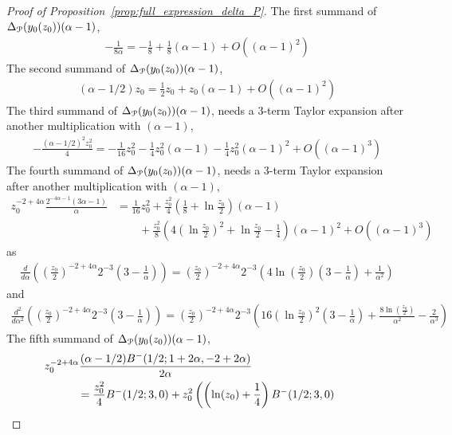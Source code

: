 \begin{proof}[Proof of Proposition~\ref{prop:full_expression_delta_P}]
The first summand of $\Delta_{{\mathcal P}}(y_0(z_0))(\alpha-1)$,
\begin{align*}
-\frac{1}{8 \alpha} = -\frac{1}{8}+\frac{1}{8}(\alpha-1) +O( (\alpha-1)^2)
\end{align*}
The second summand of $\Delta_{{\mathcal P}}(y_0(z_0))(\alpha-1)$,
\begin{align*}
(\alpha-1/2)z_0 = \frac{1}{2}z_0 +z_0 (\alpha-1)+O( (\alpha-1)^2)
\end{align*}
The third summand of $\Delta_{{\mathcal P}}(y_0(z_0))(\alpha-1)$, needs a 3-term Taylor expansion after another multiplication with $(\alpha-1)$,
\begin{align*}
- \frac{(\alpha - 1/2)^2 z_0^2}{4} = -\frac{1}{16}z_0^2 -\frac{1}{4}z_0^2(\alpha-1)-\frac{1}{4}z_0^2(\alpha-1)^2+O( (\alpha-1)^3)
\end{align*}
The fourth summand of $\Delta_{{\mathcal P}}(y_0(z_0))(\alpha-1)$, needs a  3-term Taylor expansion after another multiplication with $(\alpha-1)$,
\begin{align*}
z_0^{-2 + 4 \alpha} \frac{2^{-4 \alpha-1} (3 \alpha - 1)}{\alpha} &= \frac{1}{16}z_0^2 +\frac{z_0^2}{4}\left(\frac{1}{8}+\ln\frac{z_0}{2}\right)(\alpha-1)\\
&\qquad+\frac{z_0^2}{8}\left(4\left(\ln\frac{z_0}{2}\right)^2+\ln\frac{z_0}{2} - \frac{1}{4}\right)(\alpha-1)^2+O( (\alpha-1)^3)
\end{align*}
as
\begin{align*}
\frac{d}{d\alpha}\left( \left(\frac{z_0}{2}\right)^{-2+4\alpha} 2^{-3}\left(3-\frac{1}{\alpha}\right) \right) = \left(\frac{z_0}{2}\right)^{-2+4\alpha}2^{-3}\left(4\ln\left(\frac{z_0}{2}\right)\left(3-\frac{1}{\alpha}\right)+\frac{1}{\alpha^2}\right)
\end{align*}
and
\begin{align*}
\frac{d^2}{d\alpha^2}\left( \left(\frac{z_0}{2}\right)^{-2+4\alpha} 2^{-3}\left(3-\frac{1}{\alpha}\right) \right) = \left( \frac{z_0}{2} \right)^{-2+4\alpha}2^{-3}\left(16\left(\ln\frac{z_0}{2}\right)^2\left(3-\frac{1}{\alpha}\right)+\frac{8\ln(\frac{z_0}{2})}{\alpha^2}-\frac{2}{\alpha^3} \right)
\end{align*}
The fifth summand of $\Delta_{{\mathcal P}}(y_0(z_0))(\alpha-1)$,
\begin{align*}
	&\hspace{-30pt}z_0^{-2 + 4 \alpha} \frac{(\alpha - 1/2 ) B^-(1/2; 1 + 2 \alpha, -2 + 2 \alpha)}{2\alpha} \\
	&= \frac{z_0^2}{4} B^-(1/2;3,0) + z_0^2\left(\left(\ln(z_0)+\frac{1}{4}\right) B^-(1/2;3,0) \right. \\

\end{align*}
\end{proof}
